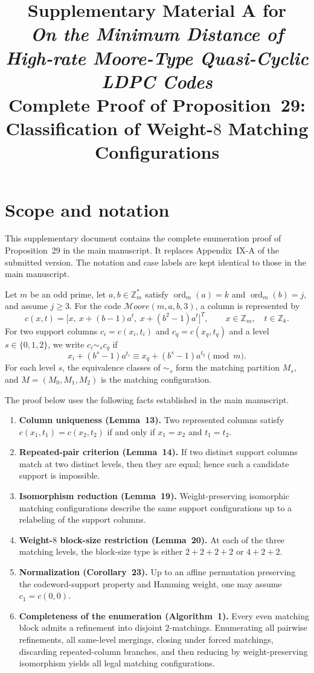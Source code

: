 \documentclass[11pt]{article}
\title{Supplementary Material A for\\
\emph{On the Minimum Distance of High-rate Moore-Type Quasi-Cyclic LDPC Codes}\\[0.6ex]
\large Complete Proof of Proposition~29: Classification of Weight-$8$ Matching Configurations}
\author{}
\date{}
\newcommand{\Z}{\mathbb{Z}}
\newcommand{\Moore}{\mathcal{M}oore}
\begin{document}
\maketitle

\section{Scope and notation}
This supplementary document contains the complete enumeration proof of Proposition~29 in the main manuscript. It replaces Appendix~IX-A of the submitted version. The notation and case labels are kept identical to those in the main manuscript.

Let $m$ be an odd prime, let $a,b\in\Z_m^*$ satisfy
$\operatorname{ord}_m(a)=k$ and $\operatorname{ord}_m(b)=j$, and assume $j\ge 3$. For the code $\Moore(m,a,b,3)$, a column is represented by
\[
 c(x,t)=\bigl[x,\ x+(b-1)a^t,\ x+(b^2-1)a^t\bigr]^T,
 \qquad x\in\Z_m,\quad t\in\Z_k.
\]
For two support columns $c_i=c(x_i,t_i)$ and $c_q=c(x_q,t_q)$ and a level $s\in\{0,1,2\}$, we write $c_i\sim_s c_q$ if
\[
 x_i+(b^s-1)a^{t_i}\equiv x_q+(b^s-1)a^{t_q}\pmod m.
\]
For each level $s$, the equivalence classes of $\sim_s$ form the matching partition $M_s$, and
$M=(M_0,M_1,M_2)$ is the matching configuration.

The proof below uses the following facts established in the main manuscript.
\begin{enumerate}[label=\textnormal{(\roman*)}]
\item \textbf{Column uniqueness (Lemma~13).} Two represented columns satisfy
$c(x_1,t_1)=c(x_2,t_2)$ if and only if $x_1=x_2$ and $t_1=t_2$.
\item \textbf{Repeated-pair criterion (Lemma~14).} If two distinct support columns match at two distinct levels, then they are equal; hence such a candidate support is impossible.
\item \textbf{Isomorphism reduction (Lemma~19).} Weight-preserving isomorphic matching configurations describe the same support configurations up to a relabeling of the support columns.
\item \textbf{Weight-$8$ block-size restriction (Lemma~20).} At each of the three matching levels, the block-size type is either $2+2+2+2$ or $4+2+2$.
\item \textbf{Normalization (Corollary~23).} Up to an affine permutation preserving the codeword-support property and Hamming weight, one may assume $c_1=c(0,0)$.
\item \textbf{Completeness of the enumeration (Algorithm~1).} Every even matching block admits a refinement into disjoint $2$-matchings. Enumerating all pairwise refinements, all same-level mergings, closing under forced matchings, discarding repeated-column branches, and then reducing by weight-preserving isomorphism yields all legal matching configurations.
\end{enumerate}
\end{document}
